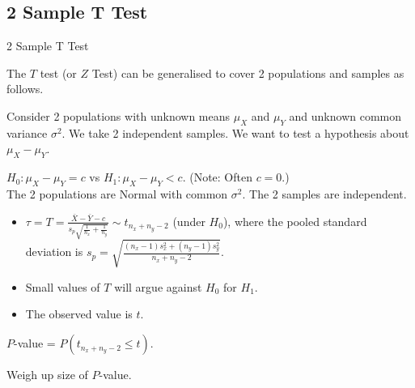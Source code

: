 \documentclass[t,xcolor=pdftex,dvipsnames,table]{beamer}
\begin{document}
\subsection[T Test]{2 Sample T Test}
\begin{frame}[fragile]{2 Sample T Test}

The $T$ test (or $Z$ Test) can be generalised to cover 2 populations and samples as follows.

\vspace{.5cm}
Consider 2 populations with unknown means $\mu_{X}$ and $\mu_{Y}$ and unknown common variance $\sigma^{2}$. We take 2 independent  samples. We want to test a hypothesis about $\mu_{X}-\mu_{Y}$.

\vspace{.5cm}
 $H_{0}: \mu_{X}-\mu_{Y} = c$ vs $H_{1}: \mu_{X}-\mu_{Y} < c$. (Note: Often $c = 0$.) \\

\vspace{.5cm}
 The 2 populations are  Normal with common $\sigma^2$. The 2 samples are independent.

\end{frame}  


\begin{frame}[fragile]{}

\begin{itemize}
\item $\tau = T = \frac{ \bar{X} - \bar{Y} - c }{ s_{p}  \sqrt{ \frac{1}{n_{x}} + \frac{1}{n_{y}} }}  \sim t_{ n_{x} + n_{y}-2 }$ (under $H_{0}$),
where the pooled standard deviation is
$s_{p} = \sqrt{  \frac{ (n_{x}-1) s_{x}^2 +  (n_{y}-1) s_{y}^2 }{n_{x} + n_{y} -2}  }$.  
\item Small values of $T$ will argue against $H_{0}$ for $H_{1}$. 
\item The observed value is $t$. 
\end{itemize}

\vspace{.5cm}
 $P$-value = $P( t_{n_{x} + n_{y} -2} \leq t)$.

\vspace{.5cm}
 Weigh up size of $P$-value.
\end{frame}  
\end{document}
